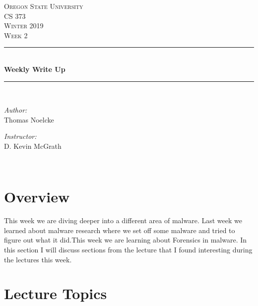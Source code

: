 \documentclass[letterpaper, onecolumn,10pt]{IEEEtran}
\begin{document}
    \begin{titlepage}
    \newcommand{\HRule}{\rule{\linewidth}{0.5mm}}
    \center
    \textsc{\Large Oregon State University}\\[1.5cm]
    \textsc{\Large CS 373}\\[0.5cm]
    \textsc{\Large Winter 2019}\\[0.5cm]
    \textsc{\Large Week 2}\\[0.5cm]
    \HRule \\[0.4cm]
    { \huge \bfseries Weekly Write Up}\\[0.4cm] %
    \HRule \\[1.5cm]
    \begin{minipage}{0.4\textwidth}
        \begin{flushleft} \large
        \emph{Author:}\\
        Thomas Noelcke
        \end{flushleft}
    \end{minipage}
    \begin{minipage}{0.4\textwidth}
        \begin{flushright} \large
        \emph{Instructor:} \\
        D. Kevin McGrath\\
        \end{flushright}
    \end{minipage}\\[2cm]
		\end{titlepage}
		
		
		\section{Overview}
        This week we are diving deeper into a different area of malware. Last week we learned about malware research where we set off some malware and tried to figure out what it did.This week we are learning about Forensics in malware. In this section I will discuss sections from the lecture that I found interesting during the lectures this week.
        
        \section{Lecture Topics}
        
\end{document}
